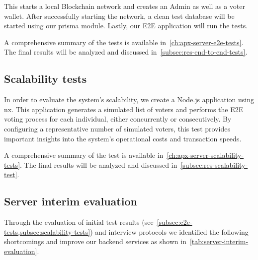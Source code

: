 This starts a local \gls{Blockchain} network and creates an \gls{Admin} as well as a voter wallet.
After successfully starting the network, a clean test database will be started using our prisma module.
Lastly, our \gls{E2E} application will run the tests.

A comprehensive summary of the tests is available in~\cref{ch:apx-server-e2e-tests}.
The final results will be analyzed and discussed in~\cref{subsec:res-end-to-end-tests}.

\subsection{Scalability tests}\label{subsec:scalability-tests}

In order to evaluate the system's scalability, we create a Node.js application using nx.
This application generates a simulated list of voters and performs the \gls{E2E} voting process for each individual, either concurrently or consecutively.
By configuring a representative number of simulated voters, this test provides important insights into the system's operational costs and transaction speeds.

A comprehensive summary of the test is available in~\cref{ch:apx-server-scalability-tests}.
The final results will be analyzed and discussed in~\cref{subsec:res-scalability-test}.

\subsection{Server interim evaluation}\label{subsec:server-interim-evaluation}

Through the evaluation of initial test results (see~\cref{subsec:e2e-tests,subsec:scalability-tests}) and interview protocols we identified the following shortcomings and improve our backend services as shown in~\cref{tab:server-interim-evaluation}.

